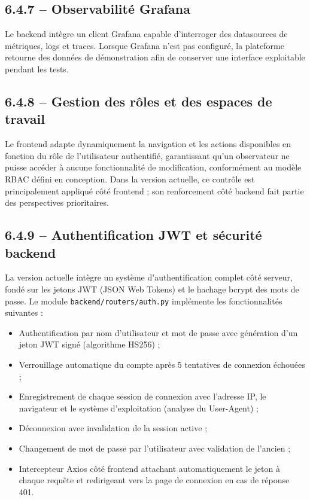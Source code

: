 \documentclass[11pt,a4paper]{report}
\begin{document}
\subsection*{6.4.7 -- Observabilité Grafana}

Le backend intègre un client Grafana capable d'interroger des datasources de
métriques, logs et traces. Lorsque Grafana n'est pas configuré, la plateforme
retourne des données de démonstration afin de conserver une interface
exploitable pendant les tests.

\subsection*{6.4.8 -- Gestion des rôles et des espaces de travail}

Le frontend adapte dynamiquement la navigation et les actions disponibles en
fonction du rôle de l'utilisateur authentifié, garantissant qu'un observateur
ne puisse accéder à aucune fonctionnalité de modification, conformément au
modèle RBAC défini en conception. Dans la version actuelle, ce contrôle est
principalement appliqué côté frontend ; son renforcement côté backend fait
partie des perspectives prioritaires.

\subsection*{6.4.9 -- Authentification JWT et sécurité backend}

La version actuelle intègre un système d'authentification complet côté
serveur, fondé sur les jetons JWT (JSON Web Tokens) et le hachage bcrypt
des mots de passe. Le module \texttt{backend/routers/auth.py} implémente
les fonctionnalités suivantes :

\begin{itemize}[label=\textbullet, leftmargin=1.5cm, labelsep=0.5cm,
                itemsep=0.1em, parsep=0em, topsep=0.2em]
    \item Authentification par nom d'utilisateur et mot de passe avec
    génération d'un jeton JWT signé (algorithme HS256) ;
    \item Verrouillage automatique du compte après 5 tentatives de connexion
    échouées ;
    \item Enregistrement de chaque session de connexion avec l'adresse IP,
    le navigateur et le système d'exploitation (analyse du User-Agent) ;
    \item Déconnexion avec invalidation de la session active ;
    \item Changement de mot de passe par l'utilisateur avec validation de
    l'ancien ;
    \item Intercepteur Axios côté frontend attachant automatiquement le jeton
    à chaque requête et redirigeant vers la page de connexion en cas de
    réponse 401.
\end{itemize}
\end{document}
